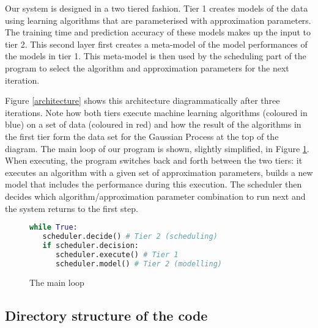 \documentclass[a4paper,12pt,twoside,openright]{report}
\begin{document}
Our system is designed in a two tiered fashion. Tier 1 creates models of the data using learning algorithms that are parameterised with approximation parameters. The training time and prediction accuracy of these models makes up the input to tier 2. This second layer first creates a meta-model of the model performances of the models in tier 1. This meta-model is then used by the scheduling part of the program to select the algorithm and approximation parameters for the next iteration. 

Figure \ref{architecture} shows this architecture diagrammatically after three iterations. Note how both tiers execute machine learning algorithms (coloured in blue) on a set of data (coloured in red) and how the result of the algorithms in the first tier form the data set for the Gaussian Process at the top of the diagram. The main loop of our program is shown, slightly simplified, in Figure \ref{mainloop}. When executing, the program switches back and forth between the two tiers: it executes an algorithm with a given set of approximation parameters, builds a new model that includes the performance during this execution. The scheduler then decides which algorithm/approximation parameter combination to run next and the system returns to the first step.


\begin{figure}[ht]
\begin{lstlisting}[language=Python]
while True:
   scheduler.decide() # Tier 2 (scheduling)
   if scheduler.decision:
      scheduler.execute() # Tier 1
      scheduler.model() # Tier 2 (modelling)
\end{lstlisting}
\caption{The main loop}
\label{mainloop}
\end{figure}


\subsection{Directory structure of the code}
\end{document}
